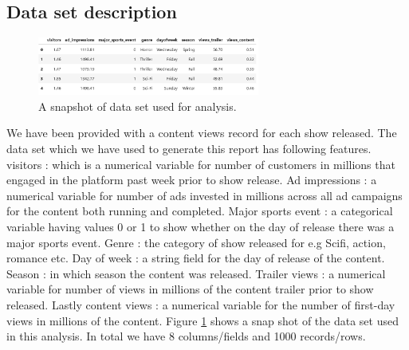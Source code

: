 \documentclass[12pt,a4paper]{style}
\begin{document}
\subsection{Data set description}
\begin{figure}
	\vspace{-1mm} %
	\includegraphics[width=0.65\textwidth]{dataset.png}
	\vspace{-4mm} %
	\caption{A snapshot of data set used for analysis.}
	\label{fig:dataset}
\end{figure}
We have been provided with a content views record for each show released. The data set which we have used to generate this report has following features. visitors : which is a numerical variable for number of customers in millions that engaged in the platform past week prior to show release. Ad impressions : a numerical variable for number of ads invested in millions across all ad campaigns for the content both running and completed. Major sports event : a categorical variable having values 0 or 1 to show whether on the day of release there was a major sports event. Genre : the category of show released for e.g Scifi, action, romance etc. Day of week : a string field for the day of release of the content. Season : in which season the content was released. Trailer views : a numerical variable for number of views in millions of the content trailer prior to show released. Lastly content views : a numerical variable for the number of first-day views in millions of the content. Figure \ref{fig:dataset} shows a snap shot of the data set used in this analysis. In total we have 8 columns/fields and 1000 records/rows.    
\end{document}
